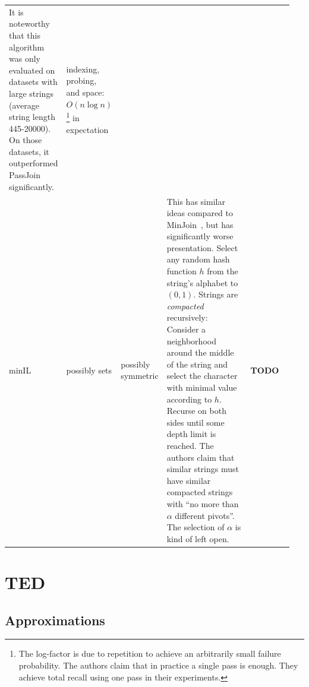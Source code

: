 \documentclass{article}
\begin{document}
\begin{footnotesize}
\begin{longtable}[c]{p{0.1\linewidth}p{0.05\linewidth}p{0.1\linewidth}p{0.5\linewidth}p{0.2\linewidth}}
        It is noteworthy that this algorithm was only evaluated on datasets with large strings (average string length 445-20000). On those datasets, it outperformed PassJoin significantly.&
        indexing, probing, and space: $O(n\log n)$\footnote{The log-factor is due to repetition to achieve an arbitrarily small failure probability. The authors claim that in practice a single pass is enough. They achieve total recall using one pass in their experiments.} in expectation
        \tabularnewline
        minIL~\cite{DBLP:conf/icde/YangZWLZ22}&
        possibly sets&
        possibly symmetric&
        This has similar ideas compared to MinJoin~\cite{DBLP:conf/kdd/Zhang019}, but has significantly worse presentation. Select any random hash function $h$ from the string's alphabet to $(0,1)$. Strings are \textit{compacted} recursively: Consider a neighborhood around the middle of the string and select the character with minimal value according to $h$. Recurse on both sides until some depth limit is reached. The authors claim that similar strings must have similar compacted strings with \enquote{no more than $\alpha$ different pivots}. The selection of $\alpha$ is kind of left open.&
        \textbf{TODO}
        \tabularnewline
        \bottomrule
    \end{longtable}
\end{footnotesize}

\section{TED}

\subsection{Approximations}
\end{document}
